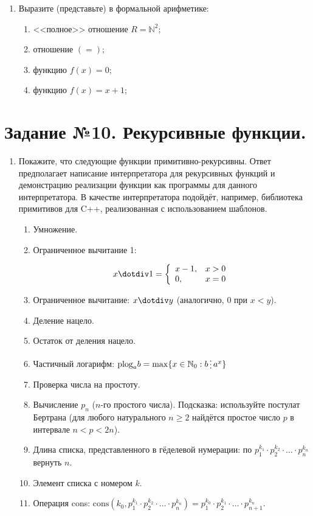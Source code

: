 \documentclass[10pt,a4paper,oneside]{article}
\begin{document}
\begin{enumerate}
\item Выразите (представьте) в формальной арифметике:
\begin{enumerate}
\item <<полное>> отношение $R = \mathbb{N}^2$;
\item отношение $(=)$;
\item функцию $f(x) = 0$;
\item функцию $f(x) = x + 1$;
\end{enumerate}

\end{enumerate}

\section*{Задание №10. Рекурсивные функции.}
\begin{enumerate}
\item Покажите, что следующие функции примитивно-рекурсивны. Ответ предполагает написание интерпретатора
для рекурсивных функций и демонстрацию реализации функции как программы для данного интерпретатора. В качестве
интерпретатора подойдёт, например, библиотека примитивов для C++, реализованная с использованием шаблонов.
\begin{enumerate}
\item Умножение.
\item Ограниченное вычитание 1:

$$x\dotdiv 1 = \left\{\begin{array}{ll}x-1, & x > 0\\
                      0, & x = 0
         \end{array}\right.$$
\item Ограниченное вычитание: $x \dotdiv y$ (аналогично, 0 при $x < y$).

\item Деление нацело.
\item Остаток от деления нацело.
\item Частичный логарифм: $\text{plog}_a b = \max \{ x \in \mathbb{N}_0 : b \mathop{\raisebox{-2pt}{\vdots}} a ^ x \}$
\item Проверка числа на простоту.
\item Вычисление $p_n$ ($n$-го простого числа). Подсказка: используйте постулат Бертрана (для любого натурального $n \ge 2$ найдётся 
простое число $p$ в интервале $n < p < 2n$).
\item Длина списка, представленного в гёделевой нумерации: по $p_1^{k_1} \cdot p_2^{k_2} \cdot \dots \cdot p_n^{k_n}$ вернуть $n$.
\item Элемент списка с номером $k$.
\item Операция cons: $\text{cons}(k_0, p_1^{k_1} \cdot p_2^{k_2} \cdot \dots \cdot p_n^{k_n}) = p_1^{k_0} \cdot p_2^{k_1} \cdot \dots \cdot p_{n+1}^{k_n}$.
\end{enumerate}


\end{enumerate}
\end{document}
